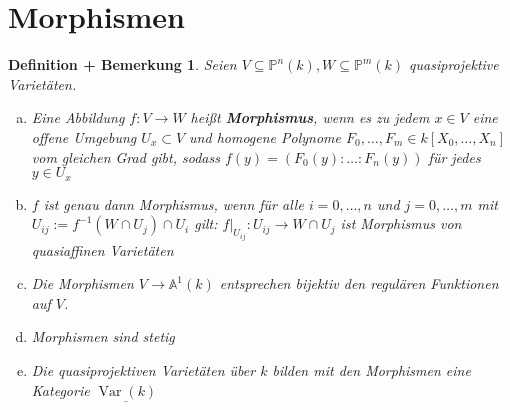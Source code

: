 \documentclass[a4paper,12pt]{report}
\theoremstyle{break}
\newtheorem{DefBem}[Def]{Definition + Bemerkung}
\theoremstyle{nonumberbreak}
\theoremstyle{nonumberplain}
\newcommand{\emp}[1]{\textbf{\emph{#1}}}
\newcommand{\begriff}[1]{{\index{#1}}\emp{#1}}
\DeclareMathOperator{\Var}{Var}
\newcommand{\A}{\mathbb{A}}
\newcommand{\IP}{\mathbb{P}}%
\begin{document}
\newpage


\section{Morphismen}

\begin{DefBem}\label{bem13.1}
Seien $V\subseteq\IP^n(k), W\subseteq\IP^m(k)$ quasiprojektive Variet\"aten.\begin{enumerate}[a)]
\item
	Eine Abbildung $f:V\to W$ hei\ss t \begriff{Morphismus}, wenn es zu jedem $x\in V$ eine offene Umgebung $U_x \subset V$ und homogene Polynome $F_0,\ldots ,F_m \in k[X_0,\ldots ,X_n]$ vom gleichen Grad gibt, sodass $f(y)=(F_0(y):\ldots :F_n(y))$ f\"ur jedes $y\in U_x$
\item\label{bem13.1b}
	$f$ ist genau dann Morphismus, wenn f\"ur alle $i=0,\ldots ,n$ und $j=0,\ldots ,m$ mit $U_{ij}:=f^{-1}(W\cap U_j)\cap U_i$ gilt: $f|_{U_{ij}}:U_{ij}\to W\cap U_j$ ist Morphismus von quasiaffinen Variet\"aten
\item\label{bem13.1c}
	Die Morphismen $V\to \A^1(k)$ entsprechen bijektiv den regul\"aren Funktionen auf $V$.
\item\label{bem13.1d}
	Morphismen sind stetig
\item
	Die quasiprojektiven Variet\"aten \"uber $k$ bilden mit den Morphismen eine Kategorie $\underline{\Var(k)}$
\end{enumerate}\end{DefBem}
\end{document}

